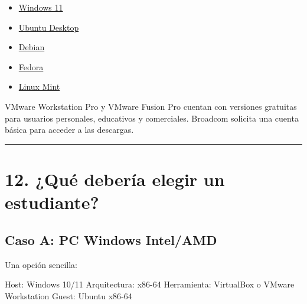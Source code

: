\documentclass[
  spanish,
  letterpaper,
]{scrbook}
\newenvironment{Shaded}{\begin{snugshade}}{\end{snugshade}}
\newcommand{\NormalTok}[1]{\textcolor[rgb]{0.00,0.23,0.31}{#1}}
\providecommand{\tightlist}{%
  \setlength{\itemsep}{0pt}\setlength{\parskip}{0pt}}
\begin{document}
\begin{itemize}
\tightlist
\item
  \href{https://www.microsoft.com/software-download/windows11}{Windows
  11}
\item
  \href{https://ubuntu.com/download/desktop}{Ubuntu Desktop}
\item
  \href{https://www.debian.org/distrib/}{Debian}
\item
  \href{https://fedoraproject.org/}{Fedora}
\item
  \href{https://linuxmint.com/download.php}{Linux Mint}
\end{itemize}

\begin{tcolorbox}[enhanced jigsaw, arc=.35mm, bottomrule=.15mm, bottomtitle=1mm, breakable, colback=white, colbacktitle=quarto-callout-note-color!10!white, colframe=quarto-callout-note-color-frame, coltitle=black, left=2mm, leftrule=.75mm, opacityback=0, opacitybacktitle=0.6, rightrule=.15mm, title=\textcolor{quarto-callout-note-color}{\faInfo}\hspace{0.5em}{VMware en la actualidad}, titlerule=0mm, toprule=.15mm, toptitle=1mm]

VMware Workstation Pro y VMware Fusion Pro cuentan con versiones
gratuitas para usuarios personales, educativos y comerciales. Broadcom
solicita una cuenta básica para acceder a las descargas.

\end{tcolorbox}

\begin{center}\rule{0.5\linewidth}{0.5pt}\end{center}


\chapter{12. ¿Qué debería elegir un
estudiante?}\label{quuxe9-deberuxeda-elegir-un-estudiante}

\section{Caso A: PC Windows Intel/AMD}\label{caso-a-pc-windows-intelamd}

Una opción sencilla:

\begin{Shaded}
\begin{Highlighting}[]
\NormalTok{Host: Windows 10/11}
\NormalTok{Arquitectura: x86{-}64}
\NormalTok{Herramienta: VirtualBox o VMware Workstation}
\NormalTok{Guest: Ubuntu x86{-}64}
\end{Highlighting}
\end{Shaded}
\end{document}
